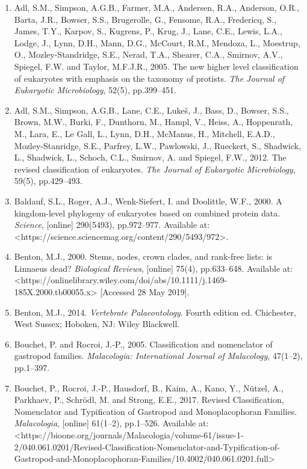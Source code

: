 \documentclass[a4paper]{article}
\begin{document}
\begin{enumerate}
\item Adl, S.M., Simpson, A.G.B., Farmer, M.A., Andersen, R.A., Anderson, O.R., Barta, J.R., Bowser, S.S., Brugerolle,
G., Fensome, R.A., Fredericq, S., James, T.Y., Karpov, S., Kugrens, P., Krug, J., Lane, C.E., Lewis, L.A., Lodge, J.,
Lynn, D.H., Mann, D.G., McCourt, R.M., Mendoza, L., Moestrup, O., Mozley-Standridge, S.E., Nerad, T.A., Shearer, C.A.,
Smirnov, A.V., Spiegel, F.W. and Taylor, M.F.J.R., 2005. The new higher level classification of eukaryotes with
emphasis on the taxonomy of protists. \textit{The Journal of Eukaryotic Microbiology}, 52(5), pp.399–451.
\item Adl, S.M., Simpson, A.G.B., Lane, C.E., Lukeš, J., Bass, D., Bowser, S.S., Brown, M.W., Burki, F., Dunthorn, M.,
Hampl, V., Heiss, A., Hoppenrath, M., Lara, E., Le Gall, L., Lynn, D.H., McManus, H., Mitchell, E.A.D.,
Mozley-Stanridge, S.E., Parfrey, L.W., Pawlowski, J., Rueckert, S., Shadwick, L., Shadwick, L., Schoch, C.L., Smirnov,
A. and Spiegel, F.W., 2012. The revised classification of eukaryotes. \textit{The Journal of Eukaryotic Microbiology},
59(5), pp.429–493.
\item Baldauf, S.L., Roger, A.J., Wenk-Siefert, I. and Doolittle, W.F., 2000. A kingdom-level phylogeny of eukaryotes
based on combined protein data. \textit{Science}, [online] 290(5493), pp.972–977. Available at:
{\textless}https://science.sciencemag.org/content/290/5493/972{\textgreater}.
\item Benton, M.J., 2000. Stems, nodes, crown clades, and rank-free lists: is Linnaeus dead? \textit{Biological
Reviews}, [online] 75(4), pp.633–648. Available at:
{\textless}https://onlinelibrary.wiley.com/doi/abs/10.1111/j.1469-185X.2000.tb00055.x{\textgreater} [Accessed 28 May
2019].
\item Benton, M.J., 2014. \textit{Vertebrate Palaeontology}. Fourth edition ed. Chichester, West Sussex; Hoboken, NJ:
Wiley Blackwell.
\item Bouchet, P. and Rocroi, J.-P., 2005. Classification and nomenclator of gastropod families. \textit{Malacologia:
International Journal of Malacology}, 47(1–2), pp.1–397.
\item Bouchet, P., Rocroi, J.-P., Hausdorf, B., Kaim, A., Kano, Y., Nützel, A., Parkhaev, P., Schrödl, M. and Strong,
E.E., 2017. Revised Classification, Nomenclator and Typification of Gastropod and Monoplacophoran Families.
\textit{Malacologia}, [online] 61(1–2), pp.1–526. Available at:
{\textless}https://bioone.org/journals/Malacologia/volume-61/issue-1-2/040.061.0201/Revised-Classification-Nomenclator-and-Typification-of-Gastropod-and-Monoplacophoran-Families/10.4002/040.061.0201.full{\textgreater}

\end{enumerate}
\end{document}
